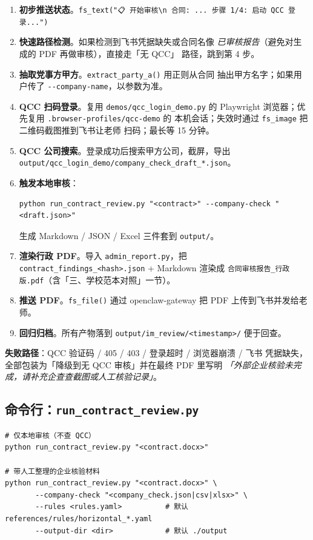 \documentclass[11pt,a4paper]{article}
\newcommand{\bt}[1]{\nolinkurl{#1}}
\begin{document}
\begin{enumerate}[leftmargin=1.4em,itemsep=2pt]
  \item \textbf{初步推送状态}。\texttt{fs\_text("📋 开始审核\textbackslash n
    合同: ... 步骤 1/4: 启动 QCC 登录...")}
  \item \textbf{快速路径检测}。如果检测到飞书凭据缺失或合同名像
    \emph{已审核报告}（避免对生成的 PDF 再做审核），直接走「无 QCC」
    路径，跳到第 4 步。
  \item \textbf{抽取党事方甲方}。\bt{extract_party_a()} 用正则从合同
    抽出甲方名字；如果用户传了 \bt{--company-name}，以参数为准。
  \item \textbf{QCC 扫码登录}。复用 \bt{demos/qcc_login_demo.py} 的
    Playwright 浏览器；优先复用 \bt{.browser-profiles/qcc-demo} 的
    本机会话；失效时通过 \bt{fs_image} 把二维码截图推到飞书让老师
    扫码；最长等 15 分钟。
  \item \textbf{QCC 公司搜索}。登录成功后搜索甲方公司，截屏，导出
    \bt{output/qcc_login_demo/company_check_draft_*.json}。
  \item \textbf{触发本地审核}：
\begin{lstlisting}[style=shell]
python run_contract_review.py "<contract>" --company-check "<draft.json>"
\end{lstlisting}
    生成 Markdown / JSON / Excel 三件套到 \bt{output/}。
  \item \textbf{渲染行政 PDF}。导入 \bt{admin_report.py}，把
    \bt{contract_findings_<hash>.json} + Markdown 渲染成
    \bt{合同审核报告_行政版.pdf}（含「三、学校范本对照」一节）。
  \item \textbf{推送 PDF}。\bt{fs_file()} 通过 openclaw-gateway 把
    PDF 上传到飞书并发给老师。
  \item \textbf{回归归档}。所有产物落到
    \bt{output/im_review/<timestamp>/} 便于回查。
\end{enumerate}

\textbf{失败路径}：QCC 验证码 / 405 / 403 / 登录超时 / 浏览器崩溃 / 飞书
凭据缺失，全部包装为「降级到无 QCC 审核」并在最终 PDF 里写明
\emph{「外部企业核验未完成，请补充企查查截图或人工核验记录」}。

\subsection{命令行：\texttt{run\_contract\_review.py}}

\begin{lstlisting}[style=shell]
# 仅本地审核（不查 QCC）
python run_contract_review.py "<contract.docx>"

# 带人工整理的企业核验材料
python run_contract_review.py "<contract.docx>" \
       --company-check "<company_check.json|csv|xlsx>" \
       --rules <rules.yaml>          # 默认 references/rules/horizontal_*.yaml
       --output-dir <dir>            # 默认 ./output
\end{lstlisting}
\end{document}
